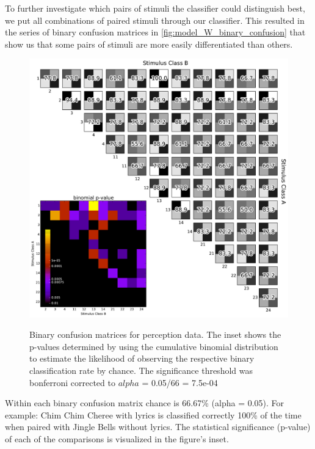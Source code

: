 To further investigate which pairs of stimuli the classifier could distinguish best, we put all combinations of paired stimuli through our classifier.
This resulted in the series of binary confusion matrices in \autoref{fig:model_W_binary_confusion} that show us that some pairs of stimuli are more easily differentiated than others. 
\begin{figure}[htb] 
  \begin{center}
    \includegraphics[width=.8\textwidth,keepaspectratio=true]{Figures/model_W_binary_confusion-512}
   \\\vspace{-0.8em}
    \caption{Binary confusion matrices for perception data.
    The inset shows the p-values determined by using the cumulative binomial distribution to estimate the likelihood of observing the respective binary classification rate by chance. The significance threshold was bonferroni corrected to $alpha$ =  0.05/66 = 7.5e-04}
    \label{fig:model_W_binary_confusion}
  \end{center}
  \vspace{-1em}
\end{figure}
Within each binary confusion matrix chance is 66.67\% (alpha = 0.05).
For example: Chim Chim Cheree with lyrics is classified correctly 100\% of the time when paired with Jingle Bells without lyrics.
The statistical significance (p-value) of each of the comparisons is visualized in the figure's inset. 

